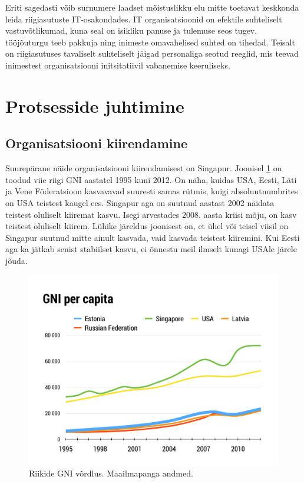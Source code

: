 \documentclass{tufte-book}
\begin{document}
Eriti sagedasti võib surnumere laadset mõistuslikku elu mitte toetavat keskkonda leida riigiasutuste IT-osakondades. IT organisatsioonid on efektile suhteliselt vastuvõtlikumad, kuna seal on isikliku panuse ja tulemuse seos tugev, tööjõuturgu teeb pakkuja ning inimeste omavahelised suhted on tihedad. Teisalt on riigiasutuses tavaliselt suhteliselt jäigad personaliga seotud reeglid, mis teevad inimestest organisatsiooni initsitatiivil vabanemise keeruliseks. 

\section{Protsesside juhtimine}
\subsection{Organisatsiooni kiirendamine}
Suurepärane näide organisatsiooni kiirendamisest on Singapur. Joonisel \ref{fig:kasv} on toodud viie riigi GNI aastatel 1995 kuni 2012. On näha, kuidas USA, Eesti, Läti ja Vene Föderatsioon kasvavavad suuresti samas rütmis, kuigi absoluutnumbrites on USA teistest kaugel ees. Singapur aga on suutnud aastast 2002 näidata teistest oluliselt kiiremat kasvu. Isegi arvestades 2008. aasta kriisi mõju, on kasv teistest oluliselt kiirem. Lühike järeldus joonisest on, et ühel või teisel viisil on Singapur suutnud mitte ainult kasvada, vaid kasvada teistest kiiremini. Kui Eesti aga ka jätkab senist stabiilset kasvu, ei õnnestu meil ilmselt kunagi USAle järele jõuda. 

\begin{figure}[h]
	\begin{center}
		\includegraphics[width=\textwidth]{kasv.pdf}
		\caption{Riikide GNI võrdlus. Maailmapanga andmed.}
		\label{fig:kasv}
	\end{center}
\end{figure}
\end{document}
